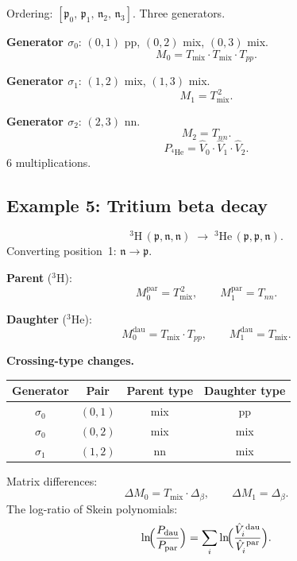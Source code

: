 \documentclass[12pt,a4paper]{article}
\begin{document}
Ordering: $[\mathfrak{p}_0,\, \mathfrak{p}_1,\, \mathfrak{n}_2,\, \mathfrak{n}_3]$.
Three generators.

\medskip

\noindent\textbf{Generator $\sigma_0$}:
$(0,1)$ pp, $(0,2)$ mix, $(0,3)$ mix.
\[
  M_0 = T_{\mathrm{mix}} \cdot T_{\mathrm{mix}} \cdot T_{pp}.
\]

\noindent\textbf{Generator $\sigma_1$}:
$(1,2)$ mix, $(1,3)$ mix.
\[
  M_1 = T_{\mathrm{mix}}^{\,2}.
\]

\noindent\textbf{Generator $\sigma_2$}:
$(2,3)$ nn.
\[
  M_2 = T_{nn}.
\]
\[
  P_{{}^4\mathrm{He}}
  = \hat{V}_0 \cdot \hat{V}_1 \cdot \hat{V}_2.
\]
6 multiplications.

\subsection*{Example 5: Tritium beta decay}

\[
  {}^3\mathrm{H}\,(\mathfrak{p},\mathfrak{n},\mathfrak{n})
  \;\longrightarrow\;
  {}^3\mathrm{He}\,(\mathfrak{p},\mathfrak{p},\mathfrak{n}).
\]
Converting position~1: $\mathfrak{n} \to \mathfrak{p}$.

\medskip

\noindent\textbf{Parent} (${}^3\mathrm{H}$):
\[
  M_0^{\mathrm{par}} = T_{\mathrm{mix}}^{\,2}, \qquad
  M_1^{\mathrm{par}} = T_{nn}.
\]

\noindent\textbf{Daughter} (${}^3\mathrm{He}$):
\[
  M_0^{\mathrm{dau}} = T_{\mathrm{mix}} \cdot T_{pp}, \qquad
  M_1^{\mathrm{dau}} = T_{\mathrm{mix}}.
\]

\noindent\textbf{Crossing-type changes.}

\medskip

\begin{tabular}{@{} c c c c @{}}
\toprule
\textbf{Generator} & \textbf{Pair} & \textbf{Parent type} & \textbf{Daughter type} \\
\midrule
$\sigma_0$ & $(0,1)$ & mix & pp \\
$\sigma_0$ & $(0,2)$ & mix & mix \\
$\sigma_1$ & $(1,2)$ & nn & mix \\
\bottomrule
\end{tabular}

\medskip

\noindent Matrix differences:
\[
  \Delta M_0 = T_{\mathrm{mix}} \cdot \Delta_\beta, \qquad
  \Delta M_1 = \Delta_\beta.
\]
The log-ratio of Skein polynomials:
\[
  \ln\!\Bigl(\frac{P_{\mathrm{dau}}}{P_{\mathrm{par}}}\Bigr)
  = \sum_i \ln\!\Bigl(\frac{\hat{V}_i^{\,\mathrm{dau}}}
                            {\hat{V}_i^{\,\mathrm{par}}}\Bigr).
\]
\end{document}
